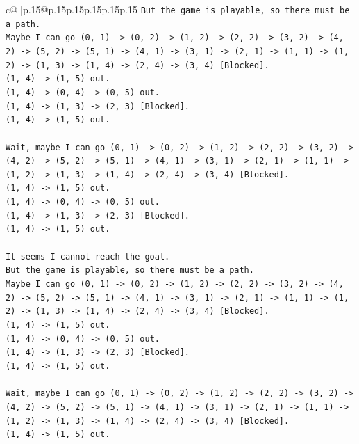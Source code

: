 \documentclass{article}
\begin{document}
{\begin{supertabular}{c@{$\;$}|p{.15\linewidth}@{}p{.15\linewidth}p{.15\linewidth}p{.15\linewidth}p{.15\linewidth}p{.15\linewidth}}
{{{\texttt{But the game is playable, so there must be a path.} \\
\texttt{Maybe I can go (0, 1) {-}> (0, 2) {-}> (1, 2) {-}> (2, 2) {-}> (3, 2) {-}> (4, 2) {-}> (5, 2) {-}> (5, 1) {-}> (4, 1) {-}> (3, 1) {-}> (2, 1) {-}> (1, 1) {-}> (1, 2) {-}> (1, 3) {-}> (1, 4) {-}> (2, 4) {-}> (3, 4) {[}Blocked{]}.} \\
\texttt{(1, 4) {-}> (1, 5) out.} \\
\texttt{(1, 4) {-}> (0, 4) {-}> (0, 5) out.} \\
\texttt{(1, 4) {-}> (1, 3) {-}> (2, 3) {[}Blocked{]}.} \\
\texttt{(1, 4) {-}> (1, 5) out.} \\
\\ 
\texttt{Wait, maybe I can go (0, 1) {-}> (0, 2) {-}> (1, 2) {-}> (2, 2) {-}> (3, 2) {-}> (4, 2) {-}> (5, 2) {-}> (5, 1) {-}> (4, 1) {-}> (3, 1) {-}> (2, 1) {-}> (1, 1) {-}> (1, 2) {-}> (1, 3) {-}> (1, 4) {-}> (2, 4) {-}> (3, 4) {[}Blocked{]}.} \\
\texttt{(1, 4) {-}> (1, 5) out.} \\
\texttt{(1, 4) {-}> (0, 4) {-}> (0, 5) out.} \\
\texttt{(1, 4) {-}> (1, 3) {-}> (2, 3) {[}Blocked{]}.} \\
\texttt{(1, 4) {-}> (1, 5) out.} \\
\\ 
\texttt{It seems I cannot reach the goal.} \\
\texttt{But the game is playable, so there must be a path.} \\
\texttt{Maybe I can go (0, 1) {-}> (0, 2) {-}> (1, 2) {-}> (2, 2) {-}> (3, 2) {-}> (4, 2) {-}> (5, 2) {-}> (5, 1) {-}> (4, 1) {-}> (3, 1) {-}> (2, 1) {-}> (1, 1) {-}> (1, 2) {-}> (1, 3) {-}> (1, 4) {-}> (2, 4) {-}> (3, 4) {[}Blocked{]}.} \\
\texttt{(1, 4) {-}> (1, 5) out.} \\
\texttt{(1, 4) {-}> (0, 4) {-}> (0, 5) out.} \\
\texttt{(1, 4) {-}> (1, 3) {-}> (2, 3) {[}Blocked{]}.} \\
\texttt{(1, 4) {-}> (1, 5) out.} \\
\\ 
\texttt{Wait, maybe I can go (0, 1) {-}> (0, 2) {-}> (1, 2) {-}> (2, 2) {-}> (3, 2) {-}> (4, 2) {-}> (5, 2) {-}> (5, 1) {-}> (4, 1) {-}> (3, 1) {-}> (2, 1) {-}> (1, 1) {-}> (1, 2) {-}> (1, 3) {-}> (1, 4) {-}> (2, 4) {-}> (3, 4) {[}Blocked{]}.} \\
\texttt{(1, 4) {-}> (1, 5) out.} \\
}}}
\end{supertabular}}
\end{document}
